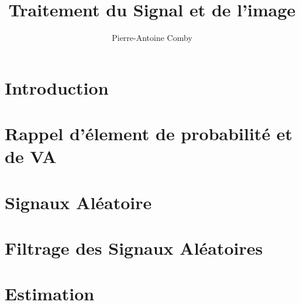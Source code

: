 \documentclass[openany]{../../cours}
\title{Traitement du Signal et de l'image}
\author{Pierre-Antoine Comby}
\begin{document}
\maketitle

\chapter*{Introduction}


\tableofcontents
\chapter{Rappel d'élement de probabilité et de VA}

\chapter{Signaux Aléatoire}

\chapter{Filtrage des Signaux Aléatoires}


\chapter{Estimation}


\end{document}
